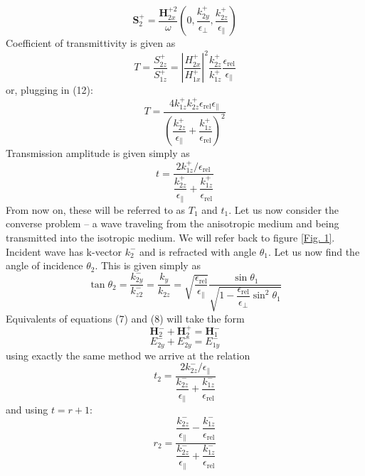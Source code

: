 \documentclass[a4paper]{scrartcl}
\begin{document}
\begin{equation}
      \mathbf{S}_2^+ = \dfrac{\mathbf{H}_{2x}^{+2}}{\omega}(0,\dfrac{k_{2y}^+}{\epsilon_\bot},
      \dfrac{k_{2z}^+}{\epsilon_\parallel})
\end{equation}
Coefficient of transmittivity is given as
\begin{equation}
      T = \dfrac{S_{2z}^+}{S_{1z}^+} = \left| \dfrac{H_{2x}^+}{H_{1x}^+} \right| ^2 \dfrac{k_{2z}^+}{k_{1z}^+}
      \dfrac{\epsilon_\textrm{rel}}{\epsilon_\parallel}
\end{equation}
or, plugging in (12):
\begin{equation}
      T = \dfrac{4 k_{1z}^+ k_{2z}^+ \epsilon_\textrm{rel} \epsilon_\parallel}{\left(
      \dfrac{k_{2z}^+}{\epsilon_\parallel} + \dfrac{k_{1z}^+}{\epsilon_\textrm{rel}} \right)^2}
\end{equation}
Transmission amplitude is given simply as
\begin{equation}
      t = \dfrac{2k_{1z}^+ / \epsilon_\textrm{rel}}{\dfrac{k_{2z}^+}{\epsilon_\parallel} +
\dfrac{k_{1z}^+}{\epsilon_\textrm{rel} }}
\end{equation}
From now on, these will be referred to as $T_1$ and $t_1$. Let us now consider the converse problem -- a wave traveling
from the anisotropic medium and being transmitted into the isotropic medium. We will refer back to figure \ref{Fig. 1}.
Incident wave has k-vector $k_{2}^-$ and is refracted with angle $\theta_1$. Let us now find the angle of incidence
$\theta_2$. This is given simply as
\begin{equation}
      \tan \theta_2 = \dfrac{k_{2y}^-}{k_{z2}^-} = \dfrac{k_y}{k_{2z}} =
      \sqrt{\dfrac{\epsilon_\textrm{rel}}{\epsilon_\parallel}} \dfrac{\sin \theta_1}
      {\sqrt{1-\dfrac{\epsilon_\textrm{rel}}{\epsilon_\bot}\sin^2 \theta_1}}
\end{equation}
Equivalents of equations (7) and (8) will take the form
\begin{equation}
      \mathbf{H}_2^- + \mathbf{H}_2^+ = \mathbf{H}_1^-
\end{equation}
\begin{equation}
      E_{2y}^- + E_{2y}^- = E_{1y}^-
\end{equation}
using exactly the same method we arrive at the relation
\begin{equation}
      t_2 = \dfrac{2 k_{2z}^- /\epsilon_\parallel}{\dfrac{k_{2z}^-}{\epsilon_\parallel} +
      \dfrac{k_{1z}^-}{\epsilon_\textrm{rel} }}
\end{equation}
and using $t = r + 1$:
\begin{equation}
      r_2 = \dfrac{ \dfrac{k_{2z}^-}{\epsilon_\parallel} - \dfrac{k_{1z}^-}{\epsilon_\textrm{rel}} }{ \dfrac{k_{2z}^-}{\epsilon_\parallel} + \dfrac{k_{1z}^-}{\epsilon_\textrm{rel}} }
\end{equation}
\newpage
\end{document}
